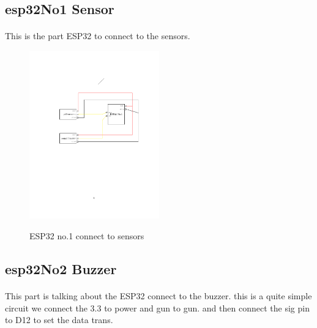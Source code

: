 \documentclass[12pt]{article}        %
\begin{document}
    \blindtext{}


    \pagebreak
    \subsection{esp32No1 Sensor}\label{subsec:esp32no1-sensor}
    \paragraph{}
    This is the part ESP32 to connect to the sensors.

    \blindtext{}



    \begin{figure}[h]
        \caption{ESP32 no.1 connect to sensors}
        \centering
        \includegraphics[width=0.5\textwidth]{../out/ESP32_No1_connect_Sensor}
        \label{fig:figure2}
    \end{figure}


    \pagebreak
    \subsection{esp32No2 Buzzer}\label{subsec:esp32no2-buzzer}
    \paragraph{}
    This part is talking about the ESP32 connect to the buzzer.
    this is a quite simple circuit we connect the 3.3 to power and gun to gun.
    and then connect the sig pin to D12 to set the data trans.

    \blindtext{}
\end{document}
